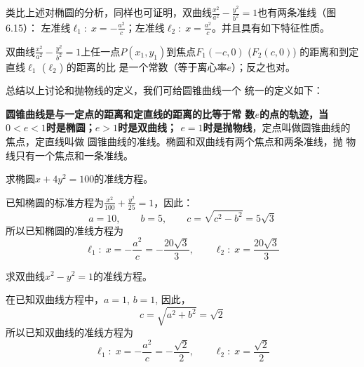 \begin{figure}[htp]
    \centering
{}
    \caption{}
\end{figure}

类比上述对椭圆的分析，同样也可证明，双曲线$\frac{x^2}{a^2}-\frac{y^2}{b^2}=1$也有两条准线（图6.15）：
左准线$\ell_1:\; x=-\frac{a^2}{c}$；左准线$\ell_2:\; x=\frac{a^2}{c}$。并且具有如下特征性质。

双曲线$\frac{x^2}{a^2}-\frac{y^2}{b^2}=1$上任一点$P(x_1,y_1)$到焦点$F_1(-c,
0)$ ($F_2(c,0)$) 的距离和到定直线$\ell_1$ ($\ell_2$) 的距离的比
是一个常数（等于离心率$e$）；反之也对。

总结以上讨论和抛物线的定义，我们可给圆锥曲线一个
统一的定义如下：

\textbf{圆锥曲线是与一定点的距离和定直线的距离的比等于常
数$e$的点的轨迹，当$0<e<1$时是椭圆；$e>1$时是双曲线；
$e=1$时是抛物线}，定点叫做圆锥曲线的焦点，定直线叫做
圆锥曲线的准线。椭圆和双曲线有两个焦点和两条准线，抛
物线只有一个焦点和一条准线。

\begin{example}
    求椭圆$x+4y^2=100$的准线方程。
\end{example}

\begin{solution}
    已知椭圆的标准方程为$\frac{x^2}{100}+\frac{y^2}{25}=1$，因此：
\[a=10,\qquad b=5,\qquad c=\sqrt{c^2-b^2}=5\sqrt{3}\]
所以已知椭圆的准线方程为
\[\ell_1:\; x=-\frac{a^2}{c}=-\frac{20\sqrt{3}}{3},\qquad \ell_2:\; x=\frac{20\sqrt{3}}{3}\]
\end{solution}

\begin{example}
    求双曲线$x^2-y^2=1$的准线方程。
\end{example}



\begin{solution}
在已知双曲线方程中，$a=1$, $b=1$, 因此，
\[c=\sqrt{a^2+b^2}=\sqrt{2}\]
所以已知双曲线的准线方程为
\[\ell_1:\; x=-\frac{a^2}{c}=-\frac{\sqrt{2}}{2},\qquad  \ell_2:\; x=\frac{\sqrt{2}}{2}\]
\end{solution}

